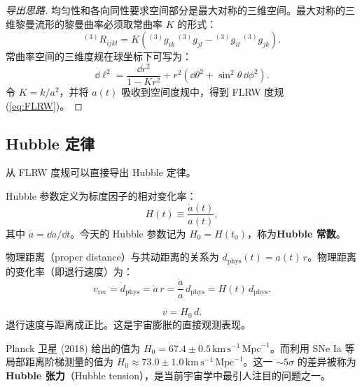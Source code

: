 \begin{proof}[导出思路]
均匀性和各向同性要求空间部分是最大对称的三维空间。最大对称的三维黎曼流形的黎曼曲率必须取常曲率 $K$ 的形式：
\begin{equation}
    {}^{(3)}\!R_{ijkl} = K \left( {}^{(3)}\!g_{ik} \, {}^{(3)}\!g_{jl} - {}^{(3)}\!g_{il} \, {}^{(3)}\!g_{jk} \right).
\end{equation}
常曲率空间的三维度规在球坐标下可写为：
\begin{equation}
    \dd\ell^2 = \frac{\dd r^2}{1 - K r^2} + r^2 (\dd\theta^2 + \sin^2\theta \,\dd\phi^2).
\end{equation}
令 $K = k/a^2$，并将 $a(t)$ 吸收到空间度规中，得到 FLRW 度规 (\ref{eq:FLRW})。
\end{proof}

\subsection{Hubble 定律}

从 FLRW 度规可以直接导出 Hubble 定律。

\begin{definition}[Hubble 参数]
Hubble 参数定义为标度因子的相对变化率：
\begin{equation}
    \boxed{H(t) \equiv \frac{\dot{a}(t)}{a(t)}},
    \label{eq:Hubble_param}
\end{equation}
其中 $\dot{a} = \dd a/\dd t$。今天的 Hubble 参数记为 $H_0 = H(t_0)$，称为\textbf{Hubble 常数}。
\end{definition}

物理距离（proper distance）与共动距离的关系为 $d_{\text{phys}}(t) = a(t) \, r$。物理距离的变化率（即退行速度）为：
\begin{equation}
    v_{\text{rec}} = \dot{d}_{\text{phys}} = \dot{a} \, r = \frac{\dot{a}}{a} \, d_{\text{phys}} = H(t) \, d_{\text{phys}}.
\end{equation}

\begin{theorem}[Hubble 定律]
\begin{equation}
    \boxed{v = H_0 \, d}.
    \label{eq:Hubble_law}
\end{equation}
退行速度与距离成正比。这是宇宙膨胀的直接观测表现。
\end{theorem}

\begin{note}
Planck 卫星 (2018) 给出的值为 $H_0 = 67.4 \pm 0.5 \,\text{km}\,\text{s}^{-1}\,\text{Mpc}^{-1}$。而利用 SNe Ia 等局部距离阶梯测量的值为 $H_0 \approx 73.0 \pm 1.0 \,\text{km}\,\text{s}^{-1}\,\text{Mpc}^{-1}$。这一 $\sim 5\sigma$ 的差异被称为\textbf{Hubble 张力}（Hubble tension），是当前宇宙学中最引人注目的问题之一。
\end{note}

